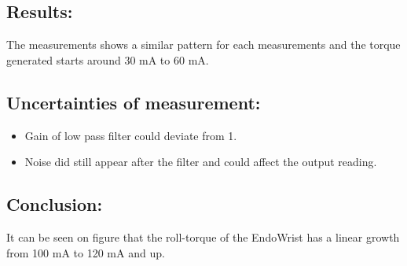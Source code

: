 


\subsection*{Results:}
The measurements shows a similar pattern for each measurements and the torque generated starts around 30 mA to 60 mA. 



%

\subsection*{Uncertainties of measurement:}
\begin{itemize}
\item Gain of low pass filter could deviate from 1.
\item Noise did still appear after the filter and could affect the output reading.
\end{itemize}

\subsection*{Conclusion:}
It can be seen on figure  that the roll-torque of the EndoWrist has a linear growth from 100 mA to 120 mA and up.

